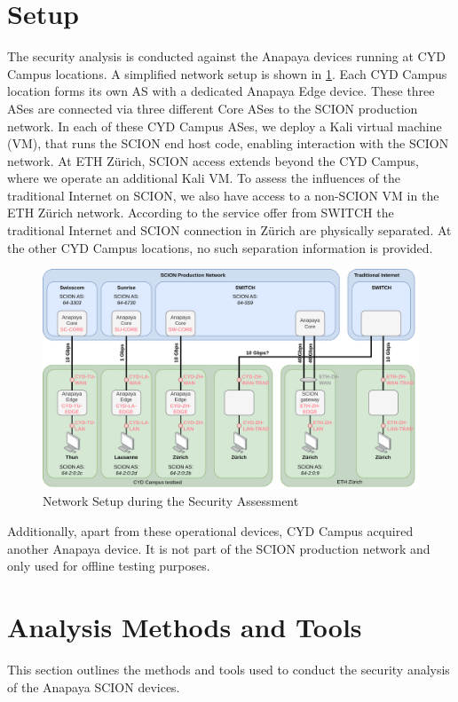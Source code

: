\section{Setup}
\label{sec:setup}
The security analysis is conducted against the Anapaya devices running at CYD Campus locations.
A simplified network setup is shown in \cref{fig:network-setup}.
Each CYD Campus location forms its own AS with a dedicated Anapaya Edge device.
These three ASes are connected via three different Core ASes to the SCION production network.
In each of these CYD Campus ASes, we deploy a Kali virtual machine (VM), that runs the SCION end host code, enabling interaction with the SCION network.
At ETH Zürich, SCION access extends beyond the CYD Campus, where we operate an additional Kali VM.
To assess the influences of the traditional Internet on SCION, we also have access to a non-SCION VM in the ETH Zürich network.
According to the service offer from SWITCH the traditional Internet and SCION connection in Zürich are physically separated.
At the other CYD Campus locations, no such separation information is provided.

\begin{figure}[h]
    \centering
    \includegraphics[width=\textwidth]{figures/scion_setup2.drawio.png}
    \caption{Network Setup during the Security Assessment}
    \label{fig:network-setup}
\end{figure}

Additionally, apart from these operational devices, CYD Campus acquired another Anapaya device.
It is not part of the SCION production network and only used for offline testing purposes.

\section{Analysis Methods and Tools}
\label{sec:analysis-methods-tools}
This section outlines the methods and tools used to conduct the security analysis of the Anapaya SCION devices.

